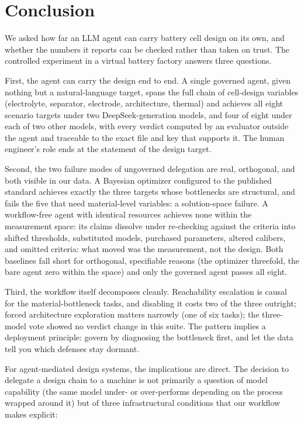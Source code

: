 \section{Conclusion}
\label{sec:conclusion}

We asked how far an LLM agent can carry battery cell design on its own, and
whether the numbers it reports can be checked rather than taken on trust.
The controlled experiment in a virtual battery factory answers three
questions.

First, the agent can carry the design end to end. A single governed
agent, given nothing but a natural-language target, spans the full chain
of cell-design variables (electrolyte, separator, electrode, architecture,
thermal) and achieves all eight scenario targets under two
DeepSeek-generation models, and four of eight under each of two
other models, with every verdict computed by an evaluator
outside the agent and traceable to the exact file and key that supports it.
The human engineer's role ends at the statement of the design target.

Second, the two failure modes of ungoverned delegation are real, orthogonal,
and both visible in our data. A Bayesian optimizer configured to the
published standard achieves exactly the three targets whose bottlenecks
are structural, and fails the five that need material-level variables: a
solution-space failure. A workflow-free agent with identical resources
achieves none within the measurement space: its claims dissolve under
re-checking against the criteria into shifted thresholds, substituted models,
purchased parameters, altered calibers, and omitted criteria: what moved
was the measurement, not the design. Both baselines fall short for orthogonal, specifiable
reasons (the optimizer threefold, the bare agent zero within the space) and
only the governed agent passes all eight.

Third, the workflow itself decomposes cleanly. Reachability escalation is
causal for the material-bottleneck tasks, and disabling it costs two of
the three outright; forced architecture exploration matters narrowly
(one of six tasks); the three-model vote showed no verdict change in this
suite. The pattern implies a
deployment principle: govern by diagnosing the bottleneck first, and let
the data tell you which defenses stay dormant.

For agent-mediated design systems, the implications are
direct. The decision to delegate a design chain to a machine is not
primarily a question of model capability (the same model under- or
over-performs depending on the process wrapped around it) but of three
infrastructural conditions that our workflow makes explicit:

